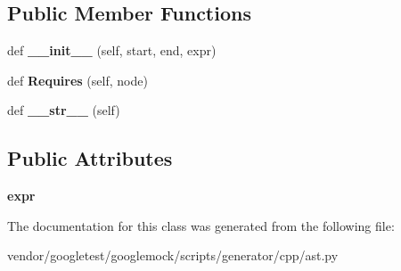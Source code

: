\subsection*{Public Member Functions}
\begin{DoxyCompactItemize}
\item 
def {\bfseries \+\_\+\+\_\+init\+\_\+\+\_\+} (self, start, end, expr)\hypertarget{classcpp_1_1ast_1_1Expr_adc83f4b17d6e28a39781678692eb25aa}{}\label{classcpp_1_1ast_1_1Expr_adc83f4b17d6e28a39781678692eb25aa}

\item 
def {\bfseries Requires} (self, node)\hypertarget{classcpp_1_1ast_1_1Expr_a9c92416eb1285068f190dcda8fd33682}{}\label{classcpp_1_1ast_1_1Expr_a9c92416eb1285068f190dcda8fd33682}

\item 
def {\bfseries \+\_\+\+\_\+str\+\_\+\+\_\+} (self)\hypertarget{classcpp_1_1ast_1_1Expr_a7ee1896fbfa7819adbd0b2f89d11ecec}{}\label{classcpp_1_1ast_1_1Expr_a7ee1896fbfa7819adbd0b2f89d11ecec}

\end{DoxyCompactItemize}
\subsection*{Public Attributes}
\begin{DoxyCompactItemize}
\item 
{\bfseries expr}\hypertarget{classcpp_1_1ast_1_1Expr_a2f4e13fb0176f2616f8703103c806462}{}\label{classcpp_1_1ast_1_1Expr_a2f4e13fb0176f2616f8703103c806462}

\end{DoxyCompactItemize}


The documentation for this class was generated from the following file\+:\begin{DoxyCompactItemize}
\item 
vendor/googletest/googlemock/scripts/generator/cpp/ast.\+py\end{DoxyCompactItemize}
